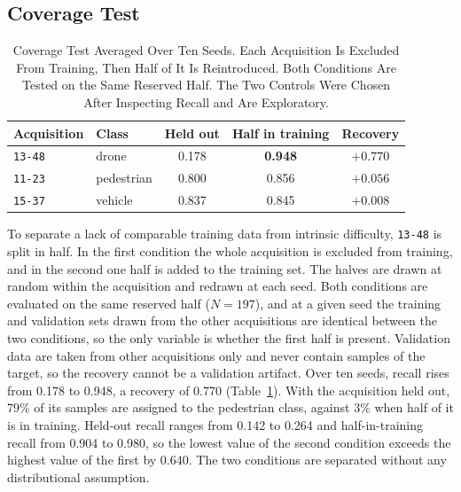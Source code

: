 \documentclass{ICIC2026}
\begin{document}
\subsection{Coverage Test}
\label{sec:coverage}

\begin{table}[t]
\caption{Coverage Test Averaged Over Ten Seeds. Each Acquisition Is Excluded From Training, Then Half of It Is Reintroduced. Both Conditions Are Tested on the Same Reserved Half. The Two Controls Were Chosen After Inspecting Recall and Are Exploratory.}
\label{tab:coverage}
\centering
\setlength{\tabcolsep}{4pt}
\begin{ICICtable}
\begin{tabular}{@{}llccc@{}}
\toprule
Acquisition & Class & Held out & Half in training & Recovery \\
\midrule
\texttt{13-48} & drone      & 0.178 & \textbf{0.948} & \textbf{$+0.770$} \\
\texttt{11-23} & pedestrian & 0.800 & 0.856          & $+0.056$ \\
\texttt{15-37} & vehicle    & 0.837 & 0.845          & $+0.008$ \\
\bottomrule
\end{tabular}
\end{ICICtable}
\end{table}

To separate a lack of comparable training data from intrinsic difficulty, \texttt{13-48} is split in half. In the first condition the whole acquisition is excluded from training, and in the second one half is added to the training set. The halves are drawn at random within the acquisition and redrawn at each seed. Both conditions are evaluated on the same reserved half ($N=197$), and at a given seed the training and validation sets drawn from the other acquisitions are identical between the two conditions, so the only variable is whether the first half is present. Validation data are taken from other acquisitions only and never contain samples of the target, so the recovery cannot be a validation artifact. Over ten seeds, recall rises from 0.178 to 0.948, a recovery of 0.770 (Table~\ref{tab:coverage}). With the acquisition held out, 79\% of its samples are assigned to the pedestrian class, against 3\% when half of it is in training. Held-out recall ranges from 0.142 to 0.264 and half-in-training recall from 0.904 to 0.980, so the lowest value of the second condition exceeds the highest value of the first by 0.640. The two conditions are separated without any distributional assumption.
\end{document}
